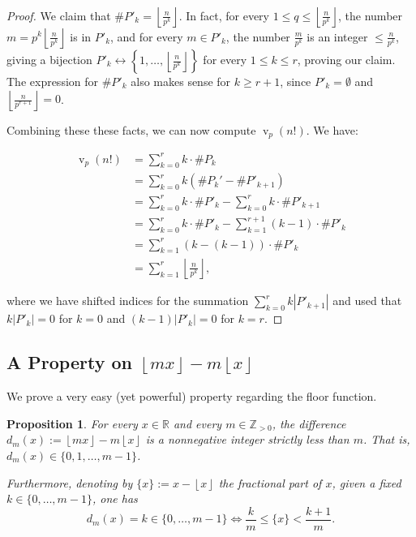 \documentclass[11pt]{article}
\newtheorem{proposition}[theorem]{Proposition}
\theoremstyle{remark}
\newcommand{\floor}[1]{\left\lfloor #1 \right\rfloor}
\newcommand{\vs}{\vspace{10px}}
\DeclareMathOperator{\val}{v}
\begin{document}
\begin{proof}
    We claim that $\#P'_k = \left \lfloor \frac{n}{p^k}\right \rfloor$. In fact, for every $1\le q\le  \left \lfloor \frac{n}{p^k}\right \rfloor$, the number $m= p^k\left \lfloor \frac{n}{p^k}\right \rfloor$ is in $P'_k$, and for every $m\in P'_k$, the number $\frac{m}{p^k}$ is an integer $\le \frac{n}{p^k}$, giving a bijection $P'_k \leftrightarrow \left\{1,\ldots, \left \lfloor \frac{n}{p^k}\right \rfloor\right\}$ for every $1\le k\le r$, proving our claim. The expression for $\#P'_k$ also makes sense for $k\ge r+1$, since $P'_k=\emptyset$ and $\floor{\frac{n}{p^{r+1}}}=0$.

    \vs
    
    Combining these these facts, we can now compute $\val_p(n!)$. We have:

    \begin{align*}
        \val_p(n!) &= \sum\limits_{k=0}^r k\cdot \#P_k\\
        &= \sum\limits_{k=0}^rk\left( \#P_k'- \#P'_{k+1}\right)\\
        &= \sum\limits_{k=0}^r k\cdot \#P'_k - \sum\limits_{k=0}^r k\cdot \#P'_{k+1}\\
        &= \sum\limits_{k=0}^r k\cdot \#P'_k - \sum\limits_{k=1}^{r+1} (k-1)\cdot \#P'_{k}\\
        &= \sum_{k=1}^r (k-(k-1))\cdot \#P'_k\\
        &= \sum_{k=1}^r \left \lfloor \frac{n}{p^k} \right \rfloor,
    \end{align*}

    where we have shifted indices for the summation $\sum\limits_{k=0}^r k|P'_{k+1}|$ and used that $k|P'_k|=0$ for $k = 0$ and $(k-1)|P'_k| = 0$ for $k =r$.
\end{proof}

\vs
\subsection{A Property on $\floor{mx}-m\floor{x}$}

We prove a very easy (yet powerful) property regarding the floor function.
\vs

\begin{proposition} \label{prop:difference_floor}
    For every $x\in \mathbb R$ and every $m\in \mathbb Z_{>0}$, the difference $d_m(x):=\floor{mx}-m\floor{x}$ is a nonnegative integer strictly less than $m$. That is, $d_m(x)\in \{0,1,\ldots, m-1\}$. 
    
    Furthermore, denoting by $\{x\}:= x-\floor{x}$ the fractional part of $x$, given a fixed $k\in \{0,\ldots, m-1\}$, one has \[d_m(x)=k\in \{0,\ldots, m-1\}\iff \frac{k}{m}\le \{x\}<\frac{k+1}{m}.\]
\end{proposition}\vs
\end{document}
